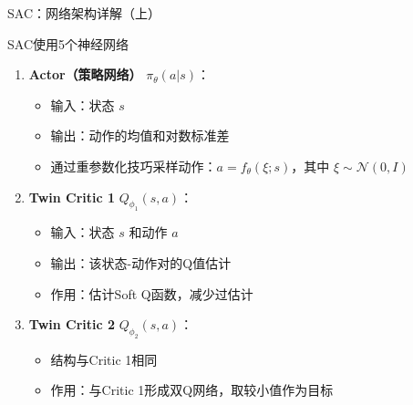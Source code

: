 \documentclass{beamer}
\begin{document}
\begin{frame}{SAC：网络架构详解（上）}
    \begin{block}{SAC使用5个神经网络}
        \begin{enumerate}
            \item \textbf{Actor（策略网络）} $\pi_\theta(a|s)$：
            \begin{itemize}
                \item 输入：状态 $s$
                \item 输出：动作的均值和对数标准差
                \item 通过重参数化技巧采样动作：$a = f_\theta(\xi; s)$，其中 $\xi \sim \mathcal{N}(0, I)$
            \end{itemize}
            
            \item \textbf{Twin Critic 1} $Q_{\phi_1}(s,a)$：
            \begin{itemize}
                \item 输入：状态 $s$ 和动作 $a$
                \item 输出：该状态-动作对的Q值估计
                \item 作用：估计Soft Q函数，减少过估计
            \end{itemize}
            
            \item \textbf{Twin Critic 2} $Q_{\phi_2}(s,a)$：
            \begin{itemize}
                \item 结构与Critic 1相同
                \item 作用：与Critic 1形成双Q网络，取较小值作为目标
            \end{itemize}
        \end{enumerate}
    \end{block}
\end{frame}
\end{document}
